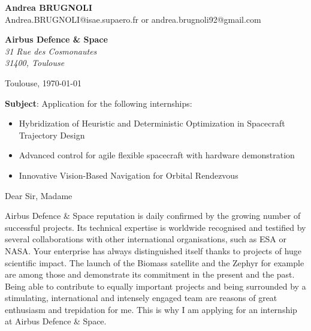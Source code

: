 \documentclass[11pt]{letter}
\begin{document}
 \sffamily
 \hfill
 \begin{flushleft}
 {\bfseries Andrea \textsc{BRUGNOLI}}\\[.35ex]
 Andrea.BRUGNOLI@isae.supaero.fr or andrea.brugnoli92@gmail.com
 \end{flushleft}
 \begin{flushright}
 {\bfseries Airbus Defence \& Space}\\[.35ex]
 \small\itshape
 31 Rue des Cosmonautes\\
 31400, Toulouse
 \end{flushright}
 \begin{flushright}
 Toulouse, \today 
 \end{flushright}
 \textbf{Subject}: Application for the following internships:
\begin{itemize}
\setlength\itemsep{0.4pt}
\item Hybridization of Heuristic and Deterministic Optimization in Spacecraft Trajectory Design 
\item Advanced control for agile flexible spacecraft with hardware demonstration 
\item Innovative Vision-Based Navigation for Orbital Rendezvous 
\end{itemize}

 Dear Sir, Madame

Airbus Defence \& Space reputation is daily confirmed by the growing number of successful projects. Its technical expertise is
worldwide recognised and testified by several collaborations with other international organisations, such as ESA or NASA. Your enterprise has always distinguished itself thanks to projects of huge scientific impact. The launch of the Biomass satellite and the Zephyr for example are among those and demonstrate its commitment in the present and the past. Being able to contribute to equally important projects and being surrounded by a stimulating, international and intensely engaged team are reasons of great enthusiasm and trepidation for me. This is why I am applying for an internship at Airbus Defence \& Space.


\end{document}
